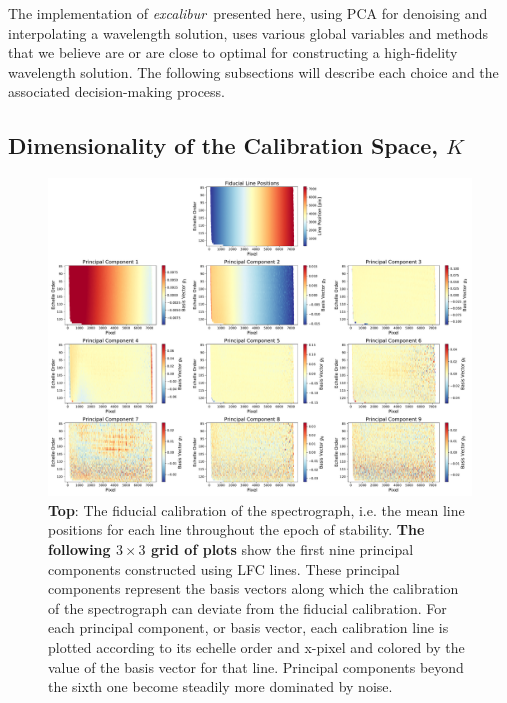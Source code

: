 \documentclass[twocolumn,table,xcolor,trackchanges]{aastex63}
\newcommand{\project}[1]{\textsl{#1}}
\newcommand{\name}{\project{excalibur}}
\begin{document}
The implementation of \name\ presented here, using PCA for denoising and interpolating a wavelength solution, uses various global variables and methods that we believe are or are close to optimal for constructing a high-fidelity wavelength solution.  The following subsections will describe each choice and the associated decision-making process.

\subsection{Dimensionality of the Calibration Space, $K$}
\begin{figure}[t]
\centering
\includegraphics[width=\textwidth]{Figures/pcsLfc9.pdf}
\caption{\textbf{Top}:  The fiducial calibration of the spectrograph, i.e. the mean line positions for each line throughout the epoch of stability.  \textbf{The following $3 \times 3$ grid of plots} show the first nine principal components constructed using LFC lines.  These principal components represent the basis vectors along which the calibration of the spectrograph can deviate from the fiducial calibration.  For each principal component, or basis vector, each calibration line is plotted according to its echelle order and x-pixel and colored by the value of the basis vector for that line.  Principal components beyond the sixth one become steadily more dominated by noise.}
\label{fig:pcLfc}
\end{figure}
\end{document}
